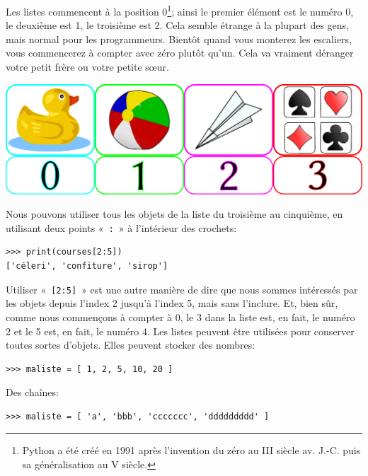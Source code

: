 Les listes commencent à la position 0\footnote{Python a été créé en 1991 après l'invention du zéro au III siècle av. J.-C. puis sa généralisation au V siècle.}; ainsi le premier élément est le numéro 0, le deuxième est 1, le troisième est 2. Cela semble étrange à la plupart des gens, mais normal pour les programmeurs. Bientôt quand vous monterez les escaliers, vous commencerez à compter avec zéro plutôt qu'un. Cela va vraiment déranger votre petit frère ou votre petite sœur.\\

\begin{center}
\includegraphics[scale=0.7]{images/liste.pdf} 

\end{center}
Nous pouvons utiliser tous les objets de la liste du troisième au cinquième, en utilisant deux points «~\verb+:+~» à l'intérieur des crochets:

\begin{Verbatim}[frame=single,rulecolor=\color{mbleu}, label=à taper]
>>> print(courses[2:5])
['céleri', 'confiture', 'sirop']
\end{Verbatim}

Utiliser «~\verb+[2:5]+~» est une autre manière de dire que nous sommes intéressés par les objets depuis l'index 2 jusqu'à l'index 5, mais sans l'inclure. Et, bien sûr, comme nous commençons à compter à 0, le 3 dans la liste est, en fait, le numéro 2 et le 5 est, en fait, le numéro 4. Les listes peuvent être utilisées pour conserver toutes sortes d'objets. Elles peuvent stocker des nombres:\\


\begin{Verbatim}[frame=single,rulecolor=\color{mbleu}, label=à taper]
>>> maliste = [ 1, 2, 5, 10, 20 ]
\end{Verbatim}

Des chaînes:

\begin{Verbatim}[frame=single,rulecolor=\color{mbleu}, label=à taper]
>>> maliste = [ 'a', 'bbb', 'ccccccc', 'ddddddddd' ]
\end{Verbatim}

